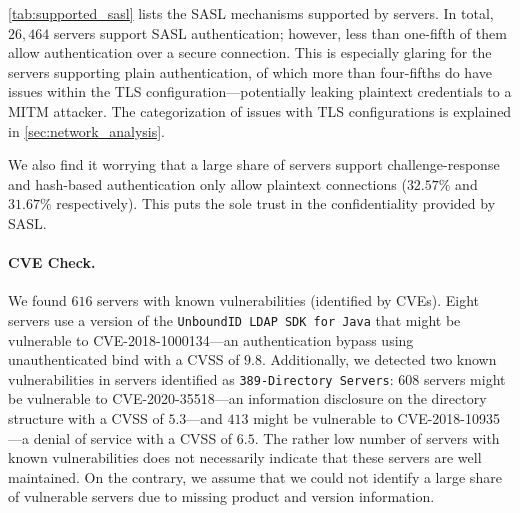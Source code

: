 \cref{tab:supported_sasl} lists the SASL mechanisms supported by servers. In total, $26,464$ servers support SASL authentication; however, less than one-fifth of them allow authentication over a secure connection. This is especially glaring for the servers supporting plain authentication, of which more than four-fifths do have issues within the TLS configuration---potentially leaking plaintext credentials to a \gls{MITM} attacker. The categorization of issues with TLS configurations is explained in \cref{sec:network_analysis}.

We also find it worrying that a large share of servers support challenge-response and hash-based authentication only allow plaintext connections ($32.57\%$ and $31.67\%$ respectively). This puts the sole trust in the confidentiality provided by SASL.

\paragraph{CVE Check.}
We found $616$ servers with known vulnerabilities (identified by CVEs). Eight servers use a version of the \texttt{UnboundID LDAP SDK for Java} that might be vulnerable to CVE-2018-1000134---an authentication bypass using unauthenticated bind with a CVSS of $9.8$. Additionally, we detected two known vulnerabilities in servers identified as \texttt{389-Directory Servers}: $608$ servers might be vulnerable to CVE-2020-35518---an information disclosure on the directory structure with a CVSS of $5.3$---and $413$ might be vulnerable to CVE-2018-10935---a denial of service with a CVSS of $6.5$.
The rather low number of servers with known vulnerabilities does not necessarily indicate that these servers are well maintained. On the contrary, we assume that we could not identify a large share of vulnerable servers due to missing product and version information.
%


